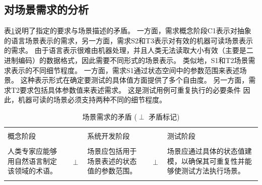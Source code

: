 \subsection{对场景需求的分析}
表\ref{tab:contradictoryRequirements}说明了指定的要求与场景描述的矛盾。
一方面，需求概念阶段C1表示对抽象的语言场景表示的需求，另一方面，需求S2和T3表示对有效的机器可读场景表示的需求。
由于语言表示很难由机器处理，并且人类无法读取大小有效（主要是二进制编码）的数据格式，因此需要不同形式的场景表示。
类似地，S1和T2场景需求表示的不同细节程度。
一方面，需求S1通过状态空间中的参数范围来表述场景。
这种表示形式在确定要测试的具体值方面提供了多个自由度。
另一方面，需求T2要求包括具体参数值来表述需求。
这是测试用例可重复执行的必要条件
因此，机器可读的场景必须支持两种不同的细节程度。

\begin{table}
	\centering
	\caption{场景需求的矛盾 ($\perp$ 矛盾标记)}
	\label{tab:contradictoryRequirements}
	\begin{tabularx}{\textwidth}{ X l X l X }
		\hline \\
		概念阶段 & & 系统开发阶段 & & 测试阶段 \\
		\hline \\
	人类专家应能够用自然语言制定该领域的术语。 & \multirow{3}{4pt}{$\perp$} &  场景应包括用于场景表述的状态值的参数范围。 & \multirow{3}{4pt}{$\perp$} & 场景应通过具体的状态值建模，以确保其可重复性并能够使测试方法执行场景。 \\
		\hline \\
	\end{tabularx}
\end{table}
